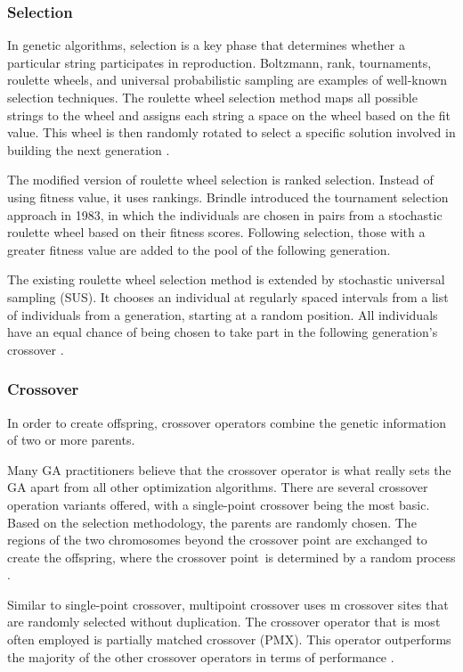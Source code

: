 \subsubsection{Selection}
In genetic algorithms, selection is a key phase that determines whether  a particular string participates in reproduction. Boltzmann, rank, tournaments, roulette wheels, and  universal probabilistic sampling are examples of well-known selection techniques. The roulette wheel selection method maps all possible strings to the wheel and assigns each string a space on the wheel  based on the fit value. This wheel is then randomly rotated to select a specific solution involved in building the next generation \citep{Holland} \citep{Katoch2021}. \par
The modified version of roulette wheel selection is ranked selection. Instead of using fitness value, it uses rankings. Brindle introduced the tournament selection approach in 1983, in which the individuals are chosen in pairs from a stochastic roulette wheel based on their fitness scores. Following selection, those with a greater fitness value are added to the pool of the following generation. \citep{Holland}\par
The existing roulette wheel selection method is extended by stochastic universal sampling (SUS). It chooses an individual at regularly spaced intervals from a list of individuals from a generation, starting at a random position. All individuals have an equal chance of being chosen to take part in the following generation's crossover \citep{Katoch2021}.

\subsubsection{Crossover}
In order to create offspring, crossover operators combine the genetic information of two or more parents.


Many GA practitioners believe that the crossover operator is what really sets the GA apart from all other optimization algorithms. There are several crossover operation variants offered, with a single-point crossover being the most basic. Based on the selection methodology, the parents are randomly chosen. The regions of the two chromosomes beyond the crossover point are exchanged to create the offspring, where the crossover point is determined by a random process \citep{Tang1996}.\par
Similar to single-point crossover, multipoint crossover uses m crossover sites that are randomly selected without duplication. The crossover operator that is most often employed is partially matched crossover (PMX). This operator outperforms the majority of the other crossover operators in terms of performance \citep{Katoch2021}.

